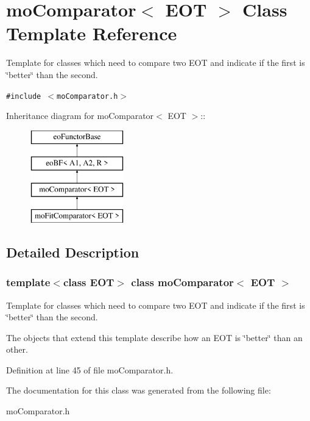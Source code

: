 \section{moComparator$<$ EOT $>$ Class Template Reference}
\label{classmo_comparator}
Template for classes which need to compare two EOT and indicate if the first is \char`\"{}better\char`\"{} than the second.  


{\tt \#include $<$moComparator.h$>$}

Inheritance diagram for moComparator$<$ EOT $>$::\begin{figure}[H]
\begin{center}
\leavevmode
\includegraphics[height=4cm]{classmo_comparator}
\end{center}
\end{figure}


\subsection{Detailed Description}
\subsubsection*{template$<$class EOT$>$ class moComparator$<$ EOT $>$}

Template for classes which need to compare two EOT and indicate if the first is \char`\"{}better\char`\"{} than the second. 

The objects that extend this template describe how an EOT is \char`\"{}better\char`\"{} than an other. 

Definition at line 45 of file moComparator.h.

The documentation for this class was generated from the following file:\begin{CompactItemize}
\item 
moComparator.h\end{CompactItemize}
